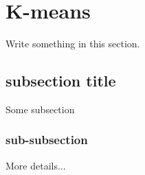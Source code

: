 \section{K-means}
Write something in this section.

\subsection{subsection title}
Some subsection 

\subsubsection{sub-subsection}
More details...